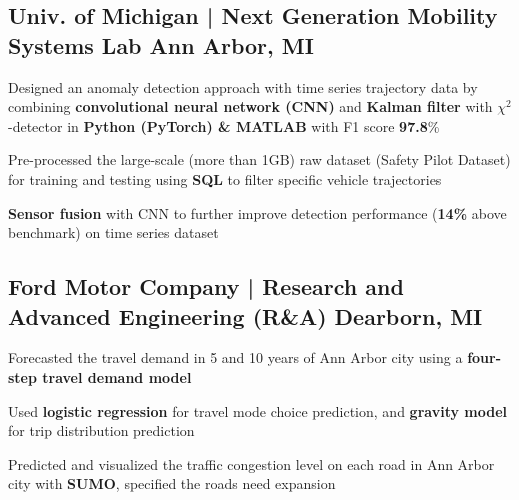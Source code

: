 \documentclass[]{Keval-resume}
\begin{document}
\subsection{Univ. of Michigan | Next Generation Mobility Systems Lab \hfill \normalfont A\lowercase{nn} A\lowercase{rbor}, MI}
\begin{cvitems}
\item 
    {Designed an anomaly detection approach with time series trajectory data
    by combining
    \textbf{convolutional neural network (CNN)} and \textbf{Kalman filter} with $\chi^2$-detector in \textbf{Python (PyTorch) \& MATLAB} with F1 score \textbf{97.8}\%}
\item
    {Pre-processed the large-scale (more than 1GB) raw dataset (Safety Pilot Dataset) for training and testing using \textbf{SQL} to filter specific vehicle trajectories}
\item 
    {\textbf{Sensor fusion} with CNN to further improve detection performance (\textbf{14\%} above benchmark) on time series dataset}
\end{cvitems}
\sectionsep

\subsection{Ford Motor Company | Research and Advanced Engineering (R\&A) \hfill \normalfont D\lowercase{earborn}, MI}
\begin{cvitems}
\item
    {Forecasted the travel demand in 5 and 10 years of Ann Arbor city using a \textbf{four-step travel demand model}}
\item 
    {Used \textbf{logistic regression} for travel mode choice prediction}, and \textbf{gravity model} for trip distribution prediction
\item 
    {Predicted and visualized the traffic congestion level on each road in Ann Arbor city with \textbf{SUMO}, specified the roads need expansion}
\end{cvitems}
\sectionsep
\end{document}
